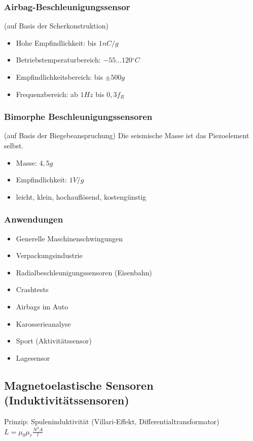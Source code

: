 \subsubsection{Airbag-Beschleunigungssensor}
(auf Basis der Scherkonstruktion)
\begin{itemize}
\item Hohe Empfindlichkeit: bis $1 \unit{nC/g}$
\item Betriebstemperaturbereich: $-55 \dots 120\unit{^\circ C}$
\item Empfindlichkeitsbereich: bis $\pm 500\unit{g}$
\item Frequenzbereich: ab $1 \unit{Hz}$ bis $0,3 f_R$
\end{itemize}
\subsubsection{Bimorphe Beschleunigungssensoren}
(auf Basis der Biegebeanspruchung) Die seismische Masse ist das Piezoelement selbst.
\begin{itemize}
\item Masse: $4,5 \unit{g}$
\item Empfindlichkeit: $1\unit{V/g}$
\item leicht, klein, hochauflösend, kostengünstig
\end{itemize}

\subsubsection{Anwendungen}
\begin{itemize}
\item Generelle Maschinenschwingungen
\item Verpackungsindustrie
\item Radialbeschleunigungssensoren (Eisenbahn)
\item Crashtests
\item Airbags im Auto
\item Karosserieanalyse
\item Sport (Aktivitätssensor)
\item Lagesensor
\end{itemize}

\subsection{Magnetoelastische Sensoren (Induktivitätssensoren)}
Prinzip: Spuleninduktivität (Villari-Effekt, Differentialtransformator)\\
$L=\mu_0 \mu_r \frac{N^2 A}{l}$

